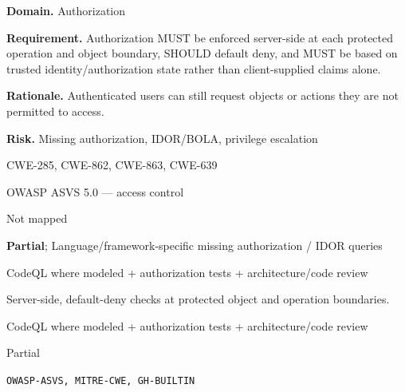 \documentclass[10pt,letterpaper]{article}
\newcommand{\prioritybadge}[2]{\tcbox[on line,boxrule=0pt,arc=1.2mm,boxsep=0.7mm,left=1mm,right=1mm,top=0.4mm,bottom=0.4mm,colback=#2!12,coltext=#2]{\scriptsize\bfseries #1}}
\begin{document}
\begin{rulebox}[title={\texttt{SCS-ALL-AUTHZ-001} \hfill \prioritybadge{Critical Control}{Critical}}]
\textbf{Domain.} Authorization

\textbf{Requirement.} Authorization MUST be enforced server-side at each protected operation and object boundary, SHOULD default deny, and MUST be based on trusted identity/authorization state rather than client-supplied claims alone.

\textbf{Rationale.} Authenticated users can still request objects or actions they are not permitted to access.

\textbf{Risk.} Missing authorization, IDOR/BOLA, privilege escalation

\begin{description}[leftmargin=2.65cm,labelwidth=2.3cm,style=nextline,itemsep=1pt,topsep=3pt]
  \item[CWE] CWE-285, CWE-862, CWE-863, CWE-639
  \item[OWASP] OWASP ASVS 5.0 --- access control
  \item[CERT] Not mapped
  \item[CodeQL] \textbf{Partial}; Language/framework-specific missing authorization / IDOR queries
  \item[Enforcement] CodeQL where modeled + authorization tests + architecture/code review
  \item[Prevention] Server-side, default-deny checks at protected object and operation boundaries.
  \item[Verification] CodeQL where modeled + authorization tests + architecture/code review
  \item[Automation] Partial
  \item[Sources] \texttt{OWASP-ASVS, MITRE-CWE, GH-BUILTIN}
\end{description}
\end{rulebox}
\end{document}
